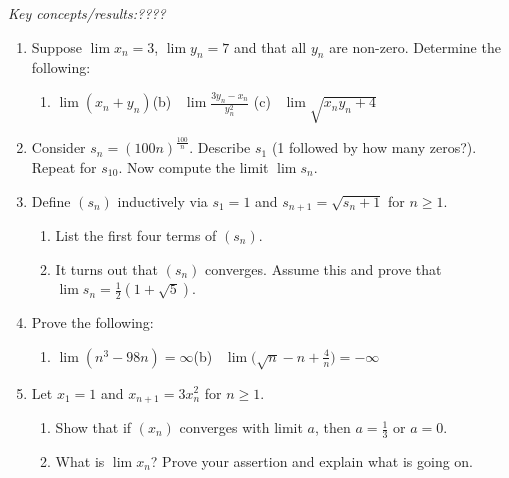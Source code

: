 \begin{exercises}{}{}
	\emph{Key concepts/results:\quad ????}
 
	\begin{enumerate}
		\item%
		Suppose $\lim x_n=3$, $\lim y_n=7$ and that all $y_n$ are non-zero. Determine the following:
	  \begin{enumerate}
	    \item $\lim(x_n+y_n)$\qquad (b) \ $\lim\frac{3y_n-x_n}{y_n^2}$ \qquad (c) \ $\lim \sqrt{x_ny_n+4}$
	  \end{enumerate}
	  
	  
	  \item Consider $s_n=(100n)^{\frac{100}n}$. Describe $s_1$ (1 followed by how many zeros?). Repeat for $s_{10}$. Now compute the limit $\lim s_n$.
	  
	  
	  \item%
	  Define $(s_n)$ inductively via $s_1=1$ and $s_{n+1}=\sqrt{s_n+1}$ for $n\ge 1$.
	  \begin{enumerate}
		  \item List the first four terms of $(s_n)$.
		  \item It turns out that $(s_n)$ converges. Assume this and prove that $\lim s_n=\frac 12(1+\sqrt 5)$.
	  \end{enumerate}
	  
	  
	  \item Prove the following:
	  \begin{enumerate}
	    \item $\lim(n^3-98n)=\infty$\qquad\qquad (b) \ $\lim \bigl(\sqrt n-n+\frac 4n\bigr)=-\infty$
	  \end{enumerate}
	  
	  
	  \item%
	  Let $x_1=1$ and $x_{n+1}=3x_n^2$ for $n\ge 1$.
	  \begin{enumerate}
		  \item Show that if $(x_n)$ converges with limit $a$, then $a=\frac 13$ or $a=0$.
		  \item What is $\lim x_n$? Prove your assertion and explain what is going on.
	  \end{enumerate}
	  

\end{enumerate}
\end{exercises}
